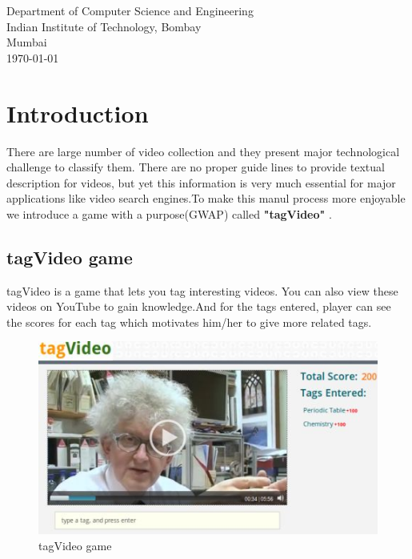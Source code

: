 \documentclass[12pt]{article}
\def\baselinestretch{1}
\begin{document}
\begin{center}
\vspace{0pt plus 2fil}
Department of Computer Science and Engineering \\ 
Indian Institute of Technology, Bombay \\ 
Mumbai\\
\vspace{0pt plus 1fil}
\today \\
\end{center}
\def\bsq{\begin{flushright} $\blacksquare$\\ \end{flushright}}
\def\tab{\hspace{5mm}}
\newpage



\begingroup{}\def\baselinestretch{1.5}\tableofcontents\endgroup     
\newpage

\newpage
{}

%

\newpage
\section{Introduction}
There are large number of video collection and they present major technological challenge to classify them. There are no proper guide lines to provide textual description for videos,   but yet this information is very much essential for major applications like video search engines.To make this manul process more enjoyable we introduce a game with a purpose(GWAP) called \textbf{"tagVideo"} .

\subsection{tagVideo game}
tagVideo is a game that lets you tag interesting videos. You can also view these videos on YouTube to gain knowledge.And for the tags entered, player can see the scores for each tag which motivates him/her to give more related tags.

\begin{figure}[h]
\begin{center}
\includegraphics{images/gamedashboard.jpg}
\caption{tagVideo game}
\label{agree on image}
\end{center}
\end{figure}
\end{document}
